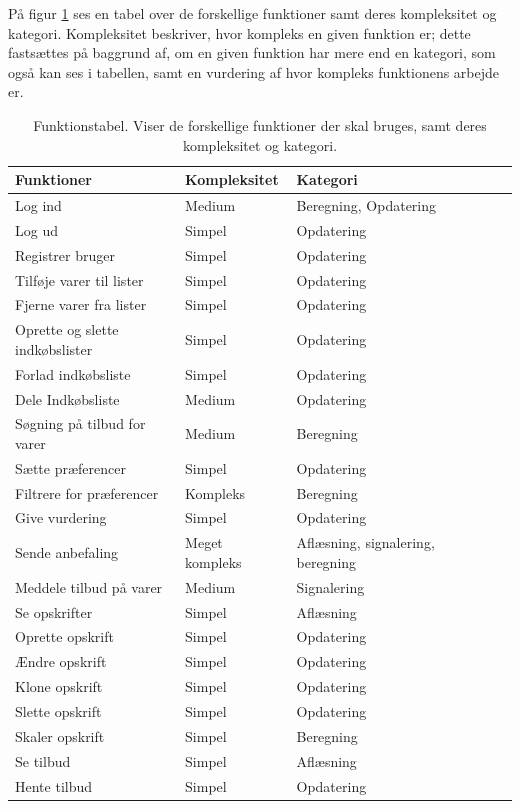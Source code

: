 På figur \ref{tabel:functionstable} ses en tabel over de forskellige funktioner samt deres kompleksitet og kategori.
Kompleksitet beskriver, hvor kompleks en given funktion er; dette fastsættes på baggrund af, om en given funktion har mere end en kategori, som også kan ses i tabellen, samt en vurdering af hvor kompleks funktionens arbejde er.

\begin{table}[h]
  \centering
      \begin{tabular}{l|lllll}
      \textbf{Funktioner}			& {Kompleksitet}	& {Kategori}  	\\ \hline
      Log ind						& Medium			& Beregning, Opdatering		\\
      Log ud						    & Simpel			& Opdatering	\\
      Registrer bruger				& Simpel			& Opdatering	\\
      Tilføje varer til lister		& Simpel       & Opdatering	\\
      Fjerne varer fra lister		& Simpel       		& Opdatering	\\
      Oprette og slette indkøbslister & Simpel       	& Opdatering	\\
      Forlad indkøbsliste			& Simpel			& Opdatering \\
      Dele Indkøbsliste				& Medium       		& Opdatering	\\
      Søgning på tilbud for varer    & Medium     		& Beregning		\\
      Sætte præferencer				& Simpel       		& Opdatering	\\
      Filtrere for præferencer		& Kompleks     		& Beregning		\\
      Give vurdering				& Simpel       		& Opdatering	\\
      Sende anbefaling				& Meget kompleks	& Aflæsning, signalering, beregning		\\
      Meddele tilbud på varer		& Medium      		& Signalering	\\
	  Se opskrifter					& Simpel       		& Aflæsning		\\
      Oprette opskrift      		& Simpel            & Opdatering  	\\
      Ændre opskrift        		& Simpel            & Opdatering	\\
      Klone	opskrift       			& Simpel            & Opdatering 	\\
      Slette opskrift				& Simpel			& Opdatering	\\
      Skaler opskrift				& Simpel			& Beregning		\\
	  Se tilbud						& Simpel       		& Aflæsning		\\
      Hente tilbud					& Simpel	       	& Opdatering	\\
    \end{tabular}
  \caption{Funktionstabel. Viser de forskellige funktioner der skal bruges, samt deres kompleksitet og kategori.}\label{tabel:functionstable}
\end{table}

